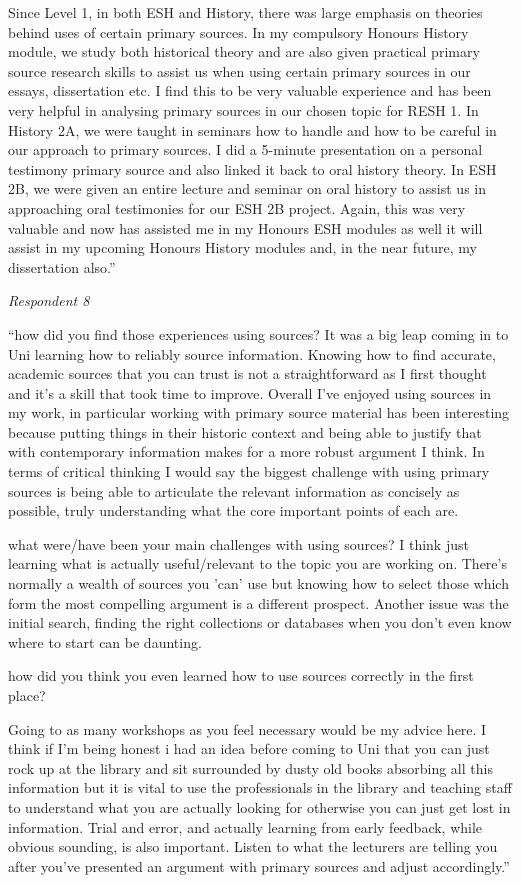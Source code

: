 \documentclass{l4proj}
\begin{document}
\begin{appendices}
Since Level 1, in both ESH and History, there was large emphasis on theories behind uses of certain primary sources. In my compulsory Honours History module, we study both historical theory and are also given practical primary source research skills to assist us when using certain primary sources in our essays, dissertation etc. I find this to be very valuable experience and has been very helpful in analysing primary sources in our chosen topic for RESH 1. In History 2A, we were taught in seminars how to handle and how to be careful in our approach to primary sources. I did a 5-minute presentation on a personal testimony primary source and also linked it back to oral history theory. In ESH 2B, we were given an entire lecture and seminar on oral history to assist us in approaching oral testimonies for our ESH 2B project. Again, this was very valuable and now has assisted me in my Honours ESH modules as well it will assist in my upcoming Honours History modules and, in the near future, my dissertation also.”

\emph{Respondent 8}

“how did you find those experiences using sources?
It was a big leap coming in to Uni learning how to reliably source information. Knowing how to find accurate, academic sources that you can trust is not a straightforward as I first thought and it's a skill that took time to improve. Overall I've enjoyed using sources in my work, in particular working with primary source material has been interesting because putting things in their historic context and being able to justify that with contemporary information makes for a more robust argument I think. In terms of critical thinking I would say the biggest challenge with using primary sources is being able to articulate the relevant information as concisely as possible, truly understanding what the core important points of each are.

what were/have been your main challenges with using sources?
I think just learning what is actually useful/relevant to the topic you are working on. There's normally a wealth of sources you 'can' use but knowing how to select those which form the most compelling argument is a different prospect. Another issue was the initial search, finding the right collections or databases when you don't even know where to start can be daunting.

how did you think you even learned how to use sources correctly in the first place? 

Going to as many workshops as you feel necessary would be my advice here. I think if I'm being honest i had an idea before coming to Uni that you can just rock up at the library and sit surrounded by dusty old books absorbing all this information but it is vital to use the professionals in the library and teaching staff to understand what you are actually looking for otherwise you can just get lost in information. Trial and error, and actually learning from early feedback, while obvious sounding, is also important. Listen to what the lecturers are telling you after you've presented an argument with primary sources and adjust accordingly.”


\end{appendices}
\end{document}
